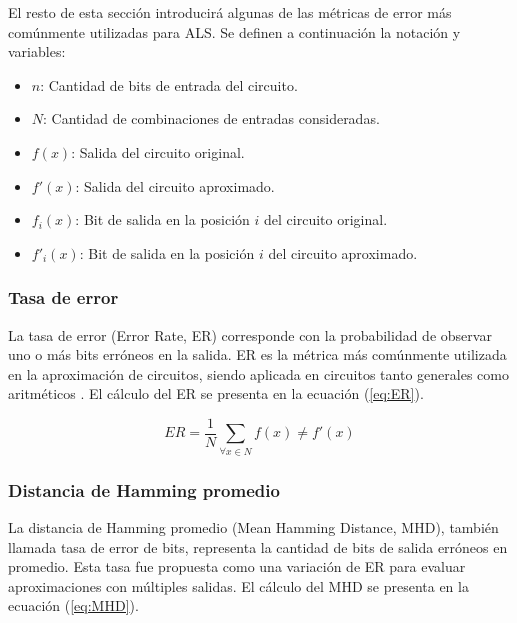 El resto de esta sección introducirá algunas de las métricas de error más
comúnmente utilizadas para ALS. Se definen a continuación la notación y variables:

\begin{itemize}
  \item $n$: Cantidad de bits de entrada del circuito.
  \item $N$: Cantidad de combinaciones de entradas consideradas.
  \item $f(x)$: Salida del circuito original.
  \item $f'(x)$: Salida del circuito aproximado.
  \item $f_i(x)$: Bit de salida en la posición $i$ del circuito original.
  \item $f'_i(x)$: Bit de salida en la posición $i$ del circuito aproximado.
\end{itemize}

\subsubsection{Tasa de error}

La tasa de error (Error Rate, ER) corresponde con la probabilidad de observar
uno o más bits erróneos en la salida. ER es la métrica más comúnmente utilizada
en la aproximación de circuitos, siendo aplicada en circuitos tanto generales
como aritméticos \cite{ammes_two-level_2022}. El cálculo del ER se presenta en
la ecuación (\ref{eq:ER}).

\begin{equation} \label{eq:ER}
  ER = \frac{1}{N} \sum_{\forall x \in N} f(x) \neq f'(x)
\end{equation}

\subsubsection{Distancia de Hamming promedio}

La distancia de Hamming promedio (Mean Hamming Distance, MHD), también llamada
tasa de error de bits, representa la cantidad de bits de salida erróneos en
promedio. Esta tasa fue propuesta como una variación de ER para evaluar
aproximaciones con múltiples salidas. El cálculo del MHD se presenta en la
ecuación (\ref{eq:MHD}).

